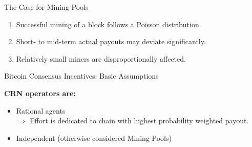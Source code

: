\documentclass[]{beamer}
\begin{document}
\begin{frame}{The Case for Mining Pools}

	\begin{enumerate}
		\item Successful mining of a block follows a Poisson distribution.
		\item Short- to mid-term actual payouts may deviate significantly.
		\item Relatively small miners are disproportionally affected.
	\end{enumerate}

\vspace{1 em}


\end{frame}

\begin{frame}{Bitcoin Consensus Incentives: Basic Assumptions}

\textbf{CRN operators are:}
\begin{itemize}
	\item	Rational agents\\$\Rightarrow$ Effort is dedicated to chain with highest probability weighted payout.
	\item	Independent (otherwise considered Mining Pools)
\end{itemize}

\vspace{1.5 em}


\end{frame}
\end{document}
